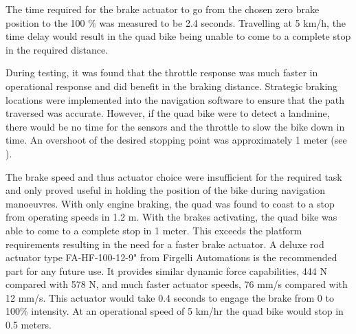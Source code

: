 \documentclass[main.tex]{subfiles}
\begin{document}
The time required for the brake actuator to go from the chosen zero brake position to the 100 \% was measured to be 2.4 seconds. Travelling at 5 km/h, the time delay would result in the quad bike being unable to come to a complete stop in the required distance. %

During testing, it was found that the throttle response was much faster in operational response and did benefit in the braking distance. Strategic braking locations were implemented into the navigation software to ensure that the path traversed was accurate. However, if the quad bike were to detect a landmine, there would be no time for the sensors and the throttle to slow the bike down in time. An overshoot of the desired stopping point was approximately 1 meter (see ).

The brake speed and thus actuator choice were insufficient for the required task and only proved useful in holding the position of the bike during navigation manoeuvres. With only engine braking, the quad was found to coast to a stop from operating speeds in 1.2 m. With the brakes activating, the quad bike was able to come to a complete stop in 1 meter. This exceeds the platform requirements resulting in the need for a faster brake actuator. A deluxe rod actuator type FA-HF-100-12-9" from Firgelli Automations is the recommended part for any future use. It provides similar dynamic force capabilities, 444 N compared with 578 N, and much faster actuator speeds, 76 mm/s compared with 12 mm/s. This actuator would take 0.4 seconds to engage the brake from 0 to 100\% intensity. At an operational speed of 5 km/hr the quad bike would stop in 0.5 meters.
\end{document}
